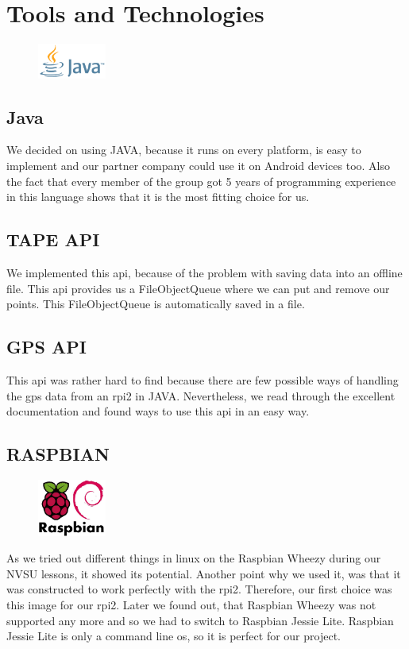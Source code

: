 \chapter{Tools and Technologies}
\begin{figure}
  \begin{center}
    \includegraphics[width=0.2\textwidth] {bilder/java}
  \end{center}
\end{figure}
\section{Java}
We decided on using JAVA, because it runs on every platform, is easy to implement and our partner company could use it on Android devices too. Also the fact that every member of the group got 5 years of programming experience in this language shows that it is the most fitting choice for us.
\section{TAPE API}
We implemented this \gls{api}, because of the problem with saving data into an offline file. This \gls{api} provides us a FileObjectQueue where we can put and remove our points. This FileObjectQueue is automatically saved in a file.
\section{GPS API}
This \gls{api} was rather hard to find because there are few possible ways of handling the \gls{gps} data from an \gls{rpi2} in JAVA. Nevertheless, we read through the excellent documentation and found ways to use this \gls{api} in an easy way.
\section{RASPBIAN}
\begin{figure}
  \begin{center}
    \includegraphics[width=0.2\textwidth] {bilder/raspbian}
  \end{center}
\end{figure}
As we tried out different things in linux on the Raspbian Wheezy during our NVSU lessons, it showed its potential. Another point why we used it, was that it was constructed to work perfectly with the \gls{rpi2}. Therefore, our first choice was this image for our \gls{rpi2}. Later we found out, that Raspbian Wheezy was not supported any more and so we had to switch to Raspbian Jessie Lite. Raspbian Jessie Lite is only a command line \gls{os}, so it is perfect for our project.
